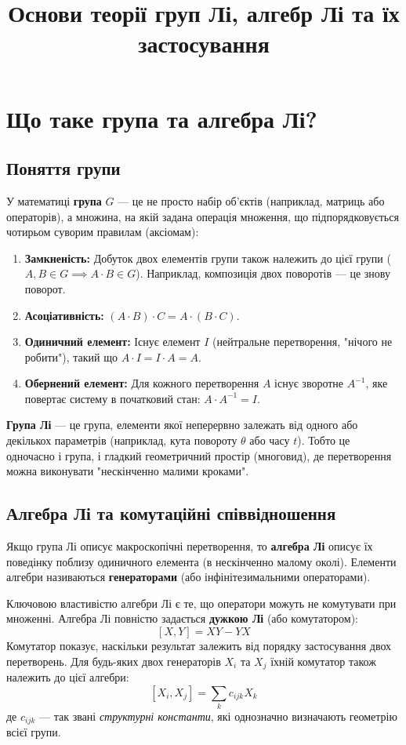 \documentclass[12pt, a4paper]{article}
\title{\textbf{Основи теорії груп Лі, алгебр Лі та їх застосування}}
\author{}
\date{}
\begin{document}
	\maketitle
	
	\section{Що таке група та алгебра Лі?}
	
	\subsection{Поняття групи}
	У математиці \textbf{група} $G$ — це не просто набір об'єктів (наприклад, матриць або операторів), а множина, на якій задана операція множення, що підпорядковується чотирьом суворим правилам (аксіомам):
	\begin{enumerate}
		\item \textbf{Замкненість:} Добуток двох елементів групи також належить до цієї групи ($A, B \in G \implies A \cdot B \in G$). Наприклад, композиція двох поворотів — це знову поворот.
		\item \textbf{Асоціативність:} $(A \cdot B) \cdot C = A \cdot (B \cdot C)$.
		\item \textbf{Одиничний елемент:} Існує елемент $I$ (нейтральне перетворення, "нічого не робити"), такий що $A \cdot I = I \cdot A = A$.
		\item \textbf{Обернений елемент:} Для кожного перетворення $A$ існує зворотне $A^{-1}$, яке повертає систему в початковий стан: $A \cdot A^{-1} = I$.
	\end{enumerate}
	
	\textbf{Група Лі} — це група, елементи якої неперервно залежать від одного або декількох параметрів (наприклад, кута повороту $\theta$ або часу $t$). Тобто це одночасно і група, і гладкий геометричний простір (многовид), де перетворення можна виконувати "нескінченно малими кроками".
	
	\subsection{Алгебра Лі та комутаційні співвідношення}
	Якщо група Лі описує макроскопічні перетворення, то \textbf{алгебра Лі} описує їх поведінку поблизу одиничного елемента (в нескінченно малому околі). Елементи алгебри називаються \textbf{генераторами} (або інфінітезимальними операторами). 
	
	Ключовою властивістю алгебри Лі є те, що оператори можуть не комутувати при множенні. Алгебра Лі повністю задається \textbf{дужкою Лі} (або комутатором):
	\[ [X, Y] = X Y - Y X \]
	Комутатор показує, наскільки результат залежить від порядку застосування двох перетворень. Для будь-яких двох генераторів $X_i$ та $X_j$ їхній комутатор також належить до цієї алгебри:
	\[ [X_i, X_j] = \sum_k c_{ijk} X_k \]
	де $c_{ijk}$ — так звані \textit{структурні константи}, які однозначно визначають геометрію всієї групи.
	
\end{document}
